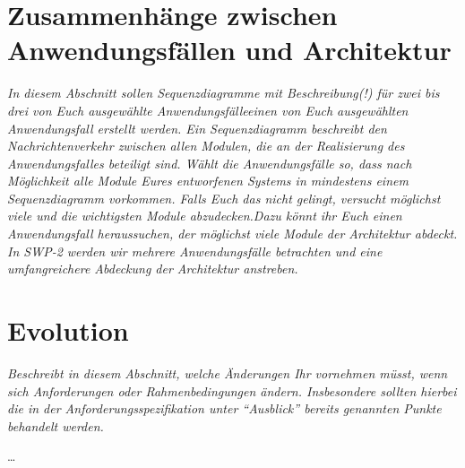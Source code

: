 \documentclass[fontsize=12pt,paper=a4,twoside]{scrartcl}
\begin{document}
\section{Zusammenhänge zwischen Anwendungsfällen und Architektur}
\label{sec:anwendungsfaelle}

{\it In diesem Abschnitt sollen Sequenzdiagramme mit Beschreibung(!)
  für {zwei bis drei von Euch ausgewählte
    Anwendungsfälle}{einen von Euch ausgewählten Anwendungsfall}
  erstellt werden. Ein Sequenzdiagramm beschreibt den
  Nachrichtenverkehr zwischen allen Modulen, die an der Realisierung
  des Anwendungsfalles beteiligt sind.  {Wählt die
    Anwendungsfälle so, dass nach Möglichkeit alle Module Eures
    entworfenen Systems in mindestens einem Sequenzdiagramm
    vorkommen. Falls Euch das nicht gelingt, versucht möglichst viele
    und die wichtigsten Module abzudecken.}{Dazu könnt ihr Euch einen
    Anwendungsfall heraussuchen, der möglichst viele Module der
    Architektur abdeckt. In SWP-2 werden wir mehrere Anwendungsfälle
    betrachten und eine umfangreichere Abdeckung der Architektur
    anstreben.} }

\section{Evolution}


\label{sec:evolution}

{\it
  Beschreibt in diesem Abschnitt, welche Änderungen Ihr
  vornehmen müsst, wenn sich Anforderungen oder Rahmenbedingungen
  ändern. Insbesondere sollten hierbei die in der
  Anforderungsspezifikation unter "`Ausblick"' bereits genannten
  Punkte behandelt werden.}

\dots
\end{document}
